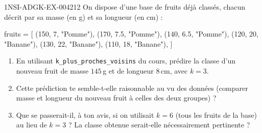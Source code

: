 \begin{exercice}{1NSI-ADGK-EX-004}{2}{12}
On dispose d'une base de fruits déjà classés, chacun décrit par sa masse (en g) et sa
longueur (en cm) :
\begin{python}
fruits = [
    (150, 7, "Pomme"), (170, 7.5, "Pomme"), (140, 6.5, "Pomme"),
    (120, 20, "Banane"), (130, 22, "Banane"), (110, 18, "Banane"),
]
\end{python}
\begin{enumerate}
  \item En utilisant \lstinline{k_plus_proches_voisins} du cours, prédire la classe d'un nouveau fruit de masse $145$\,g et de longueur $8$\,cm, avec $k=3$.
  \item Cette prédiction te semble-t-elle raisonnable au vu des données (comparer masse et longueur du nouveau fruit à celles des deux groupes) ?
  \item Que se passerait-il, à ton avis, si on utilisait $k=6$ (tous les fruits de la base) au lieu de $k=3$ ? La classe obtenue serait-elle nécessairement pertinente ?
\end{enumerate}
\end{exercice}
